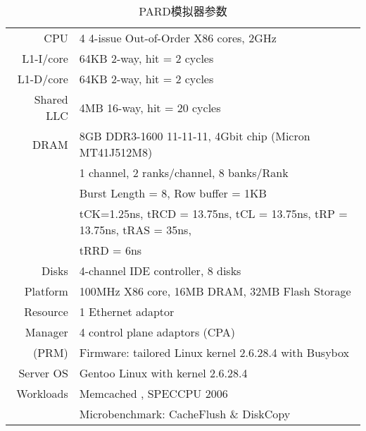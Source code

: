 \begin{table}[ht]
  \centering
  \begin{minipage}[t]{0.9\linewidth}
  \caption{PARD模拟器参数}  
  \label{tab:pard-sim-setup}
    \begin{tabular*}{\linewidth}{rl}
      \toprule[1.5pt]
      CPU                  & 4 4-issue Out-of-Order X86 cores, 2GHz\\
      L1-I/core            & 64KB 2-way, hit = 2 cycles \\
      L1-D/core            & 64KB 2-way, hit = 2 cycles \\
      Shared LLC           & 4MB 16-way, hit = 20 cycles \\
      \hline
      DRAM                 & 8GB DDR3-1600 11-11-11, 4Gbit chip (Micron MT41J512M8) \\
                           & 1 channel, 2 ranks/channel, 8 banks/Rank \\
                           & Burst Length = 8, Row buffer = 1KB \\
                           & tCK=1.25ns, tRCD = 13.75ns, tCL = 13.75ns, tRP = 13.75ns, tRAS = 35ns, \\
                           & tRRD = 6ns \\
      \hline
      Disks                & 4-channel IDE controller, 8 disks \\
      \hline
      Platform             & 100MHz X86 core, 16MB DRAM, 32MB Flash Storage \\
      Resource             & 1 Ethernet adaptor  \\
      Manager              & 4 control plane adaptors (CPA) \\
      (PRM)                & Firmware: tailored Linux kernel 2.6.28.4 with Busybox \cite{busybox} \\
      \hline
      Server OS            & Gentoo Linux with kernel 2.6.28.4 \\
      \hline
      Workloads            & Memcached \cite{memcached}, SPECCPU 2006 \cite{cpu2006} \\
                           & Microbenchmark: CacheFlush \& DiskCopy \\
      \bottomrule[1.5pt]
    \end{tabular*}\\[2pt]
  \end{minipage}
\end{table}

